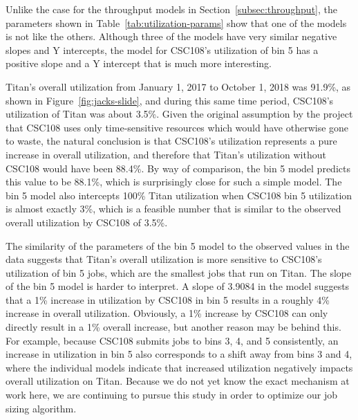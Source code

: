 Unlike the case for the throughput models in Section~\ref{subsec:throughput},
the parameters shown in Table~\ref{tab:utilization-params} show that one of the
models is not like the others. Although three of the models have very similar
negative slopes and Y intercepts, the model for CSC108's utilization of bin 5
has a positive slope and a Y intercept that is much more interesting.

Titan's overall utilization from January 1, 2017 to October 1, 2018 was
91.9\%, as shown in Figure~\ref{fig:jacks-slide}, and during this same time
period, CSC108's utilization of Titan was about 3.5\%. Given the original
assumption by the project that CSC108 uses only time-sensitive resources which
would have otherwise gone to waste, the natural conclusion is that CSC108's
utilization represents a pure increase in overall utilization, and therefore
that Titan's utilization without CSC108 would have been 88.4\%. By way of
comparison, the bin 5 model predicts this value to be 88.1\%, which is
surprisingly close for such a simple model. The bin 5 model also intercepts
100\% Titan utilization when CSC108 bin 5 utilization is almost exactly 3\%,
which is a feasible number that is similar to the observed overall utilization
by CSC108 of 3.5\%.

The similarity of the parameters of the bin 5 model to the observed values in
the data suggests that Titan's overall utilization is more sensitive to
CSC108's utilization of bin 5 jobs, which are the smallest jobs that run on
Titan. The slope of the bin 5 model is harder to interpret. A slope of 3.9084
in the model suggests that a 1\% increase in utilization by CSC108 in bin 5
results in a roughly 4\% increase in overall utilization. Obviously, a 1\%
increase by CSC108 can only directly result in a 1\% overall increase, but
another reason may be behind this. For example, because CSC108 submits jobs to
bins 3, 4, and 5 consistently, an increase in utilization in bin 5 also
corresponds to a shift away from bins 3 and 4, where the individual models
indicate that increased utilization negatively impacts overall utilization on
Titan. Because we do not yet know the exact mechanism at work here, we are
continuing to pursue this study in order to optimize our job sizing algorithm.


